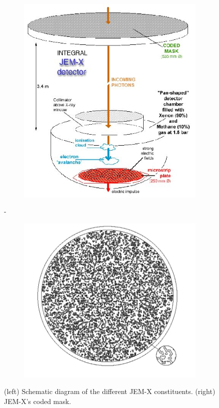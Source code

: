         \begin{figure}[H]
        \centering
        \begin{subfigure}{.45\textwidth}
            \includegraphics[width=\textwidth]{report/Figures/intro/jem_x_funct_diagram.jpg}
        \end{subfigure}%
        \hspace{1em}-
        \begin{subfigure}{.45\textwidth}
            \centering
            \includegraphics[width=\textwidth]{report/Figures/intro/jemx_coded_mask.png}
        \end{subfigure}
        \caption{(left) Schematic diagram of the different JEM-X constituents. (right) JEM-X's coded mask.}
        \label{jemx}
        \end{figure}
    

